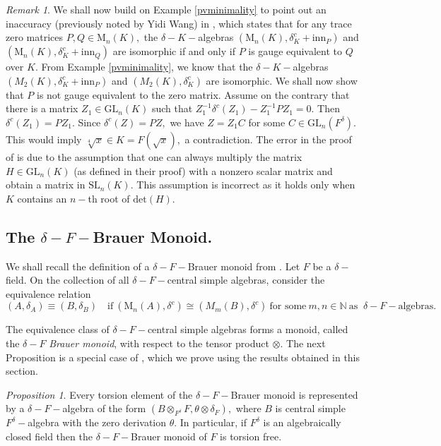 \documentclass[preprint, 11pt]{amsart}
\theoremstyle{corollary}
\theoremstyle{remark}
\newtheorem{remark}[theorem]{Remark}
\theoremstyle{proposition}
\newtheorem{proposition}[theorem]{Proposition}
\numberwithin{equation}{subsection}
\begin{document}
\begin{remark} We shall now build on Example \ref{pvminimality} to point out an inaccuracy (previously noted by Yidi Wang) in \cite[Proposition  2]{JM08}, which states that for any trace zero matrices $P, Q\in \mathrm{M}_n(K),$ the $\delta-K-$algebras $(\mathrm{M}_n(K), \delta^c_K+\mathrm{inn}_P)$ and $(\mathrm{M}_n(K), \delta^c_K+\mathrm{inn}_Q)$ are isomorphic if and only if $P$ is gauge equivalent to $Q$ over $K.$ From Example \ref{pvminimality},  we know that the $\delta-K-$algebras $(M_2(K), \delta^c_K+\mathrm{inn}_P)$ and $(M_2(K), \delta^c_K)$ are isomorphic. We shall now show that  $P$ is not gauge equivalent to the zero matrix. Assume on the contrary that there is a matrix $Z_1\in \mathrm{GL}_n(K)$ such that  $Z^{-1}_1\delta^c(Z_1)-Z^{-1}_1PZ_1=0.$ Then $\delta^c(Z_1)=PZ_1.$ Since $\delta^c(Z)=PZ,$  we have  $Z=Z_1C$ for some $C\in \mathrm{GL}_n(F^{\delta}).$ This would imply $\sqrt[4]{x}\in K=F(\sqrt{x}),$ a contradiction. 
	The error in the proof of \cite[Proposition  2]{JM08} is due to the assumption that one can always multiply the matrix $H\in\mathrm{GL}_n(K)$ (as defined in their proof) with a nonzero scalar matrix and obtain a matrix in $\mathrm{SL}_n(K).$ This assumption is incorrect as it holds only when $K$ contains an $n-$th root of $\mathrm{det}(H).$   
\end{remark}




\subsection{The $\delta-F-$Brauer Monoid.} We shall recall the definition of a $\delta-F-$Brauer monoid from \cite{Mag23}. Let $F$ be a $\delta-$field.  On the collection of all $\delta-F-$central simple algebras, consider the equivalence relation $$(A, \delta_A)\equiv (B, \delta_B) \quad \text{if} \ (\mathrm{M}_n(A), \delta^c)\cong (M_m(B), \delta^c) \ \text{for some}\ m,n\in \mathbb{N}\ \text{as }\ \delta-F-\text{algebras.} $$

The equivalence class of $\delta-F-$central simple algebras forms a monoid, called the $\delta-F$ \emph{Brauer monoid},  with respect to the tensor product $\otimes.$  The next Proposition is a special case of \cite[Theorem 1]{Mag23}, which we prove using the results  obtained in this section.
\begin{proposition} \label{torsionelements}
	Every torsion element of the $\delta-F-$Brauer monoid is represented by a $\delta-F-$algebra of the form $(B\otimes_{F^{\delta}} F, \theta\otimes \delta_F),$ where $B$ is central simple $F^{\delta}-$algebra with the zero derivation $\theta$. In particular,  if $F^{\delta}$ is an algebraically closed field then the $\delta-F-$Brauer monoid of $F$ is torsion free.
\end{proposition}
\end{document}
